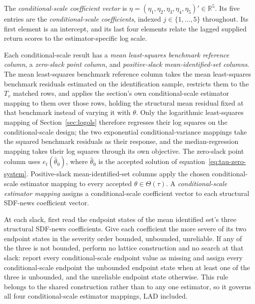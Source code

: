 \documentclass[11pt]{article}
\begin{document}
The \emph{conditional-scale coefficient vector} is
\(\eta=(\eta_1,\eta_2,\eta_3,\eta_4,\eta_5)'\in\mathbb R^5\). Its five entries are the
\emph{conditional-scale coefficients}, indexed \(j\in\{1,\ldots,5\}\)
throughout. Its first element is an intercept,
and its last four elements relate the lagged supplied return scores to the estimator-specific log
scale.

Each conditional-scale result has a \emph{mean least-squares benchmark reference column}, a
\emph{zero-slack point column}, and \emph{positive-slack mean-identified-set columns}. The mean
least-squares benchmark reference column takes the mean least-squares benchmark residuals estimated on
the identification sample, restricts them to the \(T_v\) matched rows, and applies the section's own
conditional-scale estimator mapping to them over those rows, holding the structural mean residual
fixed at that benchmark instead of varying it with \(\theta\). Only the logarithmic least-squares mapping of
Section~\ref{sec:logols} therefore regresses their log squares on the conditional-scale design; the
two exponential conditional-variance mappings take the squared benchmark residuals as their
response, and the median-regression mapping takes their log squares through its own objective.
The zero-slack point column uses
\(e_t(\widehat\theta_0)\), where \(\widehat\theta_0\) is the accepted solution of
equation~\eqref{eq:tau-zero-system}. Positive-slack mean-identified-set columns apply the chosen conditional-scale
estimator mapping to every accepted \(\theta\in\Theta(\tau)\). A
\emph{conditional-scale estimator mapping} assigns a conditional-scale coefficient vector to each
structural SDF-news coefficient vector.

At each slack, first read the endpoint states of the mean identified set's three structural
SDF-news coefficients. Give each coefficient the more severe of its two endpoint states in the
severity order bounded, unbounded, unreliable. If any of the three is not bounded, perform no
lattice construction and no search at that slack:
report every conditional-scale endpoint value as missing and assign every conditional-scale
endpoint the unbounded endpoint state when at least one of the three is unbounded, and the
unreliable endpoint state otherwise. This rule belongs to the shared construction rather than to any one
estimator, so it governs all four conditional-scale estimator mappings, LAD included.
\end{document}
